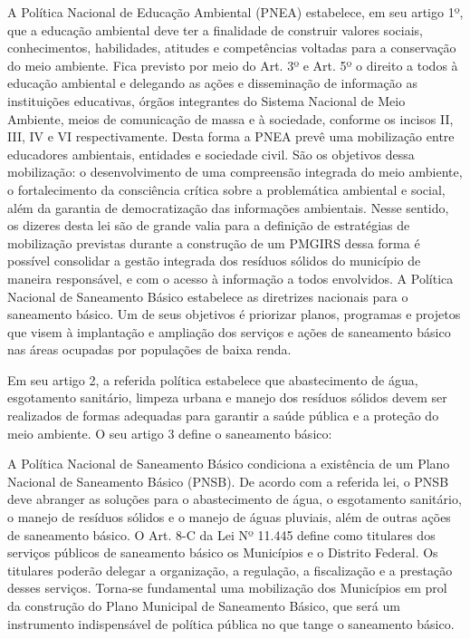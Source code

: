 	A Política Nacional de Educação Ambiental (PNEA) estabelece, em seu artigo 1º, que a educação ambiental deve ter a finalidade de construir valores sociais, conhecimentos, habilidades, atitudes e competências voltadas para a conservação do meio ambiente. Fica previsto por meio do Art. 3º e Art. 5º o direito a todos à educação ambiental e delegando as ações e disseminação de informação as instituições educativas, órgãos integrantes do Sistema Nacional de Meio Ambiente, meios de comunicação de massa e à sociedade, conforme os incisos II, III, IV e VI respectivamente. Desta forma a PNEA prevê uma mobilização entre educadores ambientais, entidades e sociedade civil. São os objetivos dessa mobilização: o desenvolvimento de uma compreensão integrada do meio ambiente, o fortalecimento da consciência crítica sobre a problemática ambiental e social, além da garantia de democratização das informações ambientais.  Nesse sentido, os dizeres desta lei são de grande valia para a definição de estratégias de mobilização previstas durante a construção de um PMGIRS dessa forma é possível consolidar a gestão integrada dos resíduos sólidos do município de maneira responsável, e com o acesso à informação a todos envolvidos.
	A Política Nacional de Saneamento Básico estabelece as diretrizes nacionais para o saneamento básico. Um de seus objetivos é priorizar planos, programas e projetos que visem à implantação e ampliação dos serviços e ações de saneamento básico nas áreas ocupadas por populações de baixa renda. 
	
	Em seu artigo 2, a referida política estabelece que abastecimento de água, esgotamento sanitário, limpeza urbana e manejo dos resíduos sólidos devem ser realizados de formas adequadas para garantir a saúde pública e a proteção do meio ambiente. O seu artigo 3 define o saneamento básico:
	
	A Política Nacional de Saneamento Básico condiciona a existência de um Plano Nacional de Saneamento Básico (PNSB). De acordo com a referida lei, o PNSB deve abranger as soluções para o abastecimento de água, o esgotamento sanitário, o manejo de resíduos sólidos e o manejo de águas pluviais, além de outras ações de saneamento básico. O Art. 8-C da Lei Nº 11.445 define como titulares dos serviços públicos de saneamento básico os Municípios e o Distrito Federal. Os titulares poderão delegar a organização, a regulação, a fiscalização e a prestação desses serviços. Torna-se fundamental uma mobilização dos Municípios em prol da construção do Plano Municipal de Saneamento Básico, que será um instrumento indispensável de política pública no que tange o saneamento básico.
	
